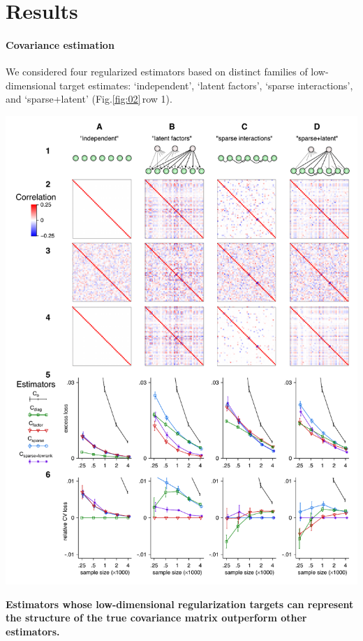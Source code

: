 \documentclass[10pt]{article}
\newcommand{\figref}[2]{Fig.\;\ref{fig:#1}\,#2}
\begin{document}
\section*{Results}
\paragraph{Covariance estimation}
We considered four regularized estimators based on distinct families of low-dimensional target estimates: `independent', `latent factors', `sparse interactions', and `sparse+latent' (\figref{02}{row 1}).  

\begin{FPfigure}
    \begin{center}
        \includegraphics{./figures/Figure02.pdf}
    \end{center}
    \caption{{\bf Estimators whose low-dimensional regularization targets can represent the structure of the true covariance matrix outperform other estimators.}
}
\end{FPfigure}
\end{document}
